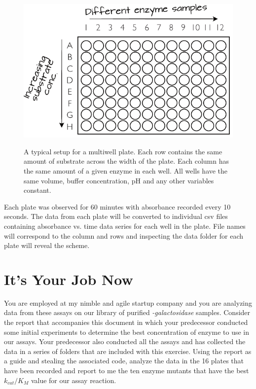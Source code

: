 \documentclass[]{tufte-handout}
\begin{document}
\begin{figure}[h!]

  \caption[0mm]{A typical setup for a multiwell plate. Each row contains the same amount of substrate across the width of the plate. Each column has the same amount of a given enzyme in each well. All wells have the same volume, buffer concentration, pH and any other variables constant.} 
  \vspace{2mm}
    \centering
  \includegraphics[scale=0.7]{Microtitreplatediagram.pdf}
  \vspace{2mm}
  \label{fig:fig4}
\end{figure}


Each plate was observed for 60 minutes with absorbance recorded every 10 seconds. The data from each plate will be converted to individual csv files containing absorbance vs. time data series for each well in the plate. File names will correspond to the column and rows and inspecting the data folder for each plate will reveal the scheme.

\section{It's Your Job Now}

You are employed at my nimble and agile startup company and you are analyzing data from these assays on our library of purified \emph{\textbeta -galactosidase} sam\-ples. Consider the report that accompanies this document in which your predecessor conducted some initial experiments to determine the best con\-cen\-tra\-tion of enzyme to use in our assays. Your predecessor also conducted all the assays and has collected the data in a series of folders that are included with this exercise. Using the report as a guide and stealing the associated code, analyze the data in the 16 plates that have been recorded and report to me the ten enzyme mutants that have the best $k_{cat}/K_M$ value for our assay reaction. 
\end{document}

